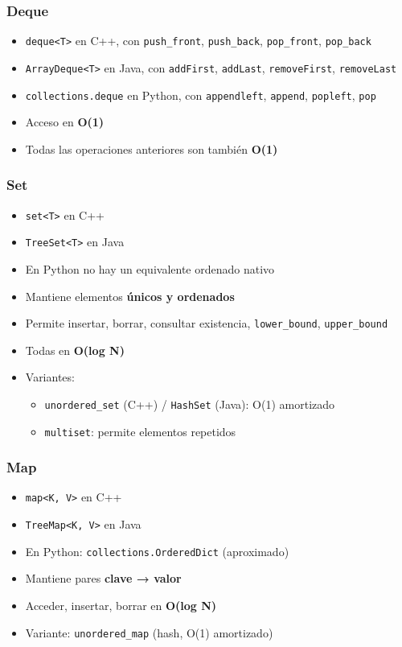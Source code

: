 \documentclass{beamer}
\begin{document}
\begin{frame}
  \frametitle{Deque}
  \begin{itemize}
    \item \texttt{deque<T>} en C++, con \texttt{push\_front}, \texttt{push\_back}, \texttt{pop\_front}, \texttt{pop\_back}
    \item \texttt{ArrayDeque<T>} en Java, con \texttt{addFirst}, \texttt{addLast}, \texttt{removeFirst}, \texttt{removeLast}
    \item \texttt{collections.deque} en Python, con \texttt{appendleft}, \texttt{append}, \texttt{popleft}, \texttt{pop}
    \item Acceso en \textbf{O(1)}
    \item Todas las operaciones anteriores son también \textbf{O(1)}
  \end{itemize}
\end{frame}

\begin{frame}
  \frametitle{Set}
  \begin{itemize}
    \item \texttt{set<T>} en C++
    \item \texttt{TreeSet<T>} en Java
    \item En Python no hay un equivalente ordenado nativo
    \item Mantiene elementos \textbf{únicos y ordenados}
    \item Permite insertar, borrar, consultar existencia, \texttt{lower\_bound}, \texttt{upper\_bound}
    \item Todas en \textbf{O(log N)}
    \item Variantes:
    \begin{itemize}
      \item \texttt{unordered\_set} (C++) / \texttt{HashSet} (Java): O(1) amortizado
      \item \texttt{multiset}: permite elementos repetidos
    \end{itemize}
  \end{itemize}
\end{frame}

\begin{frame}
  \frametitle{Map}
  \begin{itemize}
    \item \texttt{map<K, V>} en C++
    \item \texttt{TreeMap<K, V>} en Java
    \item En Python: \texttt{collections.OrderedDict} (aproximado)
    \item Mantiene pares \textbf{clave → valor}
    \item Acceder, insertar, borrar en \textbf{O(log N)}
    \item Variante: \texttt{unordered\_map} (hash, O(1) amortizado)
  \end{itemize}
\end{frame}
\end{document}
